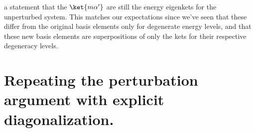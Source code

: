 a statement that the $\ket{m \alpha'}$ are still the energy eigenkets for the unperturbed system.  This matches our expectations since we've seen that these differ from the original basis elements only for degenerate energy levels, and that these new basis elements are superpositions of only the kets for their respective degeneracy levels.

\section{Repeating the perturbation argument with explicit diagonalization.}

\EndArticle

